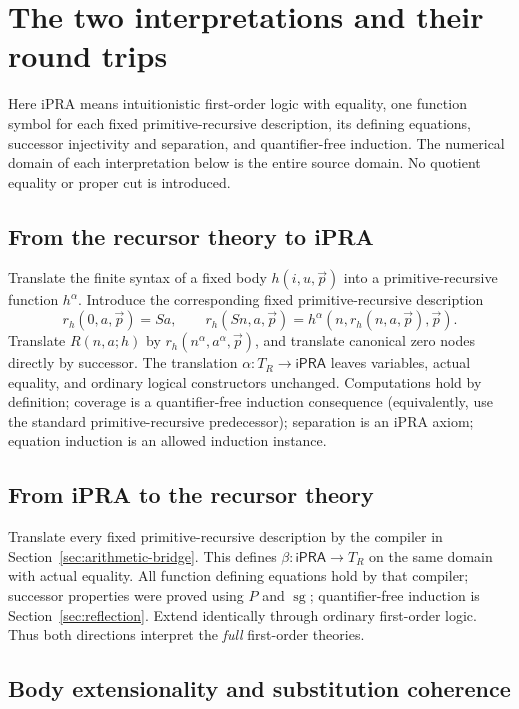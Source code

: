 \documentclass[11pt,letterpaper]{article}
\theoremstyle{definition}
\newcommand{\ipra}{\mathsf{iPRA}}
\newcommand{\TR}{T_R}
\newcommand{\sg}{\mathop{\mathrm{sg}}}
\begin{document}
\section{The two interpretations and their round trips}
\label{sec:interpretations}

Here iPRA means intuitionistic first-order logic with equality,
one function symbol for each fixed primitive-recursive description,
its defining equations, successor injectivity and separation, and
quantifier-free induction. The numerical domain of each interpretation
below is the entire source domain. No quotient equality or proper cut
is introduced.

\subsection{From the recursor theory to iPRA}

Translate the finite syntax of a fixed body $h(i,u,\vec p)$ into a
primitive-recursive function $h^\alpha$. Introduce the corresponding
fixed primitive-recursive description
\[
 r_h(0,a,\vec p)=Sa,\qquad
 r_h(Sn,a,\vec p)=h^\alpha(n,r_h(n,a,\vec p),\vec p).
\]
Translate $R(n,a;h)$ by $r_h(n^\alpha,a^\alpha,\vec p)$, and
translate canonical zero nodes directly by successor. The translation
$\alpha:\TR\to\ipra$ leaves variables, actual equality, and ordinary
logical constructors unchanged. Computations hold by definition;
coverage is a quantifier-free induction consequence (equivalently,
use the standard primitive-recursive predecessor); separation is
an iPRA axiom; equation induction is an allowed induction instance.

\subsection{From iPRA to the recursor theory}

Translate every fixed primitive-recursive description by the compiler
in Section~\ref{sec:arithmetic-bridge}. This defines
$\beta:\ipra\to\TR$ on the same domain with actual equality.
All function defining equations hold by that compiler; successor
properties were proved using $P$ and $\sg$; quantifier-free induction
is Section~\ref{sec:reflection}. Extend identically through ordinary
first-order logic. Thus both directions interpret the \emph{full}
first-order theories.

\subsection{Body extensionality and substitution coherence}
\end{document}
